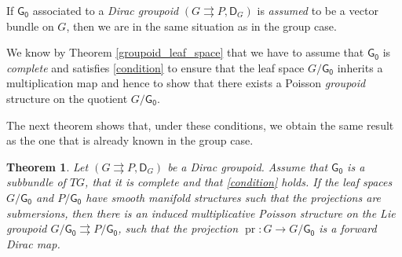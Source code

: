 \documentclass{amsart}
\newtheorem{theorem}{Theorem}[section]
\theoremstyle{definition}
\begin{document}
If $\mathsf{G_0}$ associated to a
\emph{Dirac groupoid} $(G{{\rightrightarrows}} P, \mathsf D_G)$ is \emph{assumed} to be a vector bundle on $G$, 
then we are in the same situation as in the group case.

We know by Theorem \ref{groupoid_leaf_space} that 
we have to assume that $\mathsf{G_0}$ is \emph{complete} and satisfies
 \eqref{condition} to ensure that the leaf space $G/\mathsf{G_0}$ 
inherits a multiplication map and hence to show that there  exists a Poisson \emph{groupoid} structure 
on the quotient $G/\mathsf{G_0}$.

The next theorem shows that, under these
conditions, we obtain the same result as the one that is 
already known in the group case.

\begin{theorem}\label{main}
Let $(G{{\rightrightarrows}} P, \mathsf D_G)$ be a Dirac groupoid. 
Assume 
that $\mathsf{G_0}$ is a  subbundle of $TG$, that it is complete and that \eqref{condition} 
holds.
If the leaf spaces $G/\mathsf{G_0}$ and 
$P/\mathsf{G_0}$
have smooth manifold structures 
such that the projections are submersions,
then there is an induced multiplicative   Poisson  structure
on the Lie groupoid $G/\mathsf{G_0}\rightrightarrows P/\mathsf{G_0}$, such that
the projection $\operatorname{pr}:G\to G/\mathsf{G_0}$ is a forward Dirac map.
\end{theorem}
\end{document}
